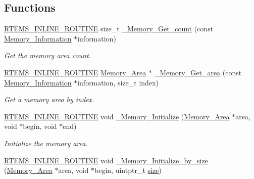 \subsection*{Functions}
\begin{DoxyCompactItemize}
\item 
\mbox{\hyperlink{group__RTEMSScoreBaseDefs_gac216239df231d5dbd15e3520b0b9313f}{R\+T\+E\+M\+S\+\_\+\+I\+N\+L\+I\+N\+E\+\_\+\+R\+O\+U\+T\+I\+NE}} size\+\_\+t \mbox{\hyperlink{group__RTEMSScoreMemory_ga23cf58983e4010f47140bc68d9ff9e93}{\+\_\+\+Memory\+\_\+\+Get\+\_\+count}} (const \mbox{\hyperlink{structMemory__Information}{Memory\+\_\+\+Information}} $\ast$information)
\begin{DoxyCompactList}\small\item\em Get the memory area count. \end{DoxyCompactList}\item 
\mbox{\hyperlink{group__RTEMSScoreBaseDefs_gac216239df231d5dbd15e3520b0b9313f}{R\+T\+E\+M\+S\+\_\+\+I\+N\+L\+I\+N\+E\+\_\+\+R\+O\+U\+T\+I\+NE}} \mbox{\hyperlink{structMemory__Area}{Memory\+\_\+\+Area}} $\ast$ \mbox{\hyperlink{group__RTEMSScoreMemory_gaceaec7a5a60fbf7f0d5e5dcd6c0828b2}{\+\_\+\+Memory\+\_\+\+Get\+\_\+area}} (const \mbox{\hyperlink{structMemory__Information}{Memory\+\_\+\+Information}} $\ast$information, size\+\_\+t index)
\begin{DoxyCompactList}\small\item\em Get a memory area by index. \end{DoxyCompactList}\item 
\mbox{\hyperlink{group__RTEMSScoreBaseDefs_gac216239df231d5dbd15e3520b0b9313f}{R\+T\+E\+M\+S\+\_\+\+I\+N\+L\+I\+N\+E\+\_\+\+R\+O\+U\+T\+I\+NE}} void \mbox{\hyperlink{group__RTEMSScoreMemory_ga0b6ffdf3dc891d567fce86ae80a0b7e3}{\+\_\+\+Memory\+\_\+\+Initialize}} (\mbox{\hyperlink{structMemory__Area}{Memory\+\_\+\+Area}} $\ast$area, void $\ast$begin, void $\ast$end)
\begin{DoxyCompactList}\small\item\em Initialize the memory area. \end{DoxyCompactList}\item 
\mbox{\hyperlink{group__RTEMSScoreBaseDefs_gac216239df231d5dbd15e3520b0b9313f}{R\+T\+E\+M\+S\+\_\+\+I\+N\+L\+I\+N\+E\+\_\+\+R\+O\+U\+T\+I\+NE}} void \mbox{\hyperlink{group__RTEMSScoreMemory_ga211a4bf287f142f95e8fa5856abb4f28}{\+\_\+\+Memory\+\_\+\+Initialize\+\_\+by\+\_\+size}} (\mbox{\hyperlink{structMemory__Area}{Memory\+\_\+\+Area}} $\ast$area, void $\ast$begin, uintptr\+\_\+t \mbox{\hyperlink{sun4u_2tte_8h_a245260f6f74972558f61b85227df5aae}{size}})

\end{DoxyCompactItemize}

